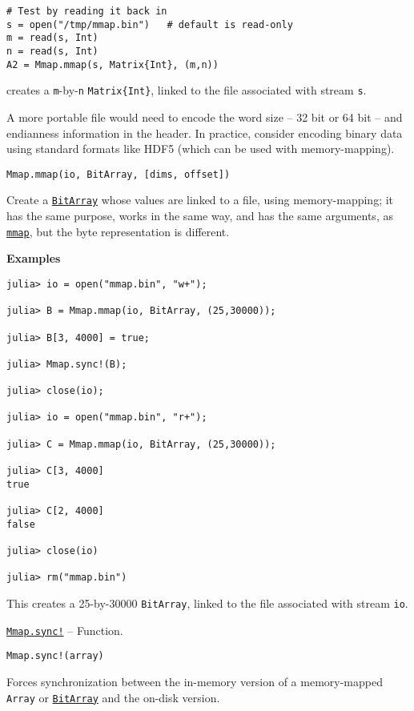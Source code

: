 \begin{adjustwidth}{2em}{0pt}
\begin{verbatim}
# Test by reading it back in
s = open("/tmp/mmap.bin")   # default is read-only
m = read(s, Int)
n = read(s, Int)
A2 = Mmap.mmap(s, Matrix{Int}, (m,n))
\end{verbatim}

creates a \texttt{m}-by-\texttt{n} \texttt{Matrix\{Int\}}, linked to the file associated with stream \texttt{s}.

A more portable file would need to encode the word size – 32 bit or 64 bit – and endianness information in the header. In practice, consider encoding binary data using standard formats like HDF5 (which can be used with memory-mapping).




\begin{lstlisting}
Mmap.mmap(io, BitArray, [dims, offset])
\end{lstlisting}

Create a \hyperlink{18015155802543401629}{\texttt{BitArray}} whose values are linked to a file, using memory-mapping; it has the same purpose, works in the same way, and has the same arguments, as \hyperlink{1028440884226576897}{\texttt{mmap}}, but the byte representation is different.

\textbf{Examples}


\begin{verbatim}
julia> io = open("mmap.bin", "w+");

julia> B = Mmap.mmap(io, BitArray, (25,30000));

julia> B[3, 4000] = true;

julia> Mmap.sync!(B);

julia> close(io);

julia> io = open("mmap.bin", "r+");

julia> C = Mmap.mmap(io, BitArray, (25,30000));

julia> C[3, 4000]
true

julia> C[2, 4000]
false

julia> close(io)

julia> rm("mmap.bin")
\end{verbatim}

This creates a 25-by-30000 \texttt{BitArray}, linked to the file associated with stream \texttt{io}.



\end{adjustwidth}
\hypertarget{10364432000624675045}{} 
\hyperlink{10364432000624675045}{\texttt{Mmap.sync!}}  -- {Function.}

\begin{adjustwidth}{2em}{0pt}


\begin{verbatim}
Mmap.sync!(array)
\end{verbatim}

Forces synchronization between the in-memory version of a memory-mapped \texttt{Array} or \hyperlink{18015155802543401629}{\texttt{BitArray}} and the on-disk version.



\end{adjustwidth}



